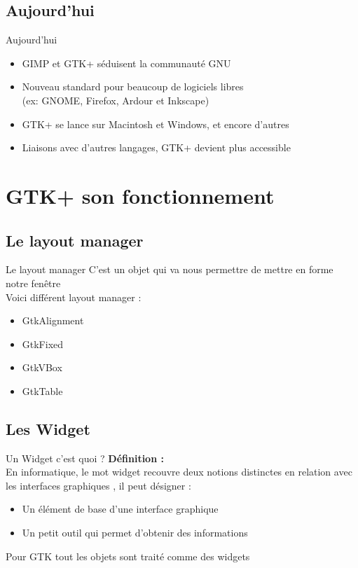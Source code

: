 \documentclass{beamer}
\begin{document}
  \subsection{Aujourd'hui}
  \begin{frame}{Aujourd'hui}
  \begin{itemize}
    \item GIMP et GTK+ séduisent la communauté GNU\\
    \item Nouveau standard pour beaucoup de logiciels libres\\(ex: GNOME, Firefox, Ardour et Inkscape)\\
    \item GTK+ se lance sur Macintosh et Windows, et encore d'autres\\
    \item Liaisons avec d'autres langages, GTK+ devient plus accessible
    \end{itemize}
  \end{frame}

  \section{GTK+ son fonctionnement}
	\subsection{Le layout manager}
	\begin{frame}{Le layout manager}
		C'est un objet qui va nous permettre de mettre en forme notre fenêtre\\
		Voici différent layout manager :\\
		\begin{itemize}
			\item GtkAlignment
			\item GtkFixed
			\item GtkVBox
			\item GtkTable
		\end{itemize}
	\end{frame}
	\subsection{Les Widget}
	\begin{frame}{Un Widget c'est quoi ?}
		\textbf{Définition : }\\
		En informatique, le mot widget recouvre deux notions distinctes en relation avec les interfaces graphiques , il peut désigner :\\
		\begin{itemize}
			\item Un élément de base d'une interface graphique
			\item Un petit outil qui permet d'obtenir des informations
		\end{itemize}
		Pour GTK tout les objets sont traité comme des widgets\\
	\end{frame}
\end{document}

